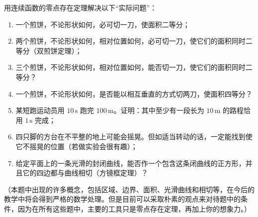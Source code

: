 \begin{xreferenceproblem}[1]
用连续函数的零点存在定理解决以下“实际问题”：
  \begin{enumerate}[label=(\arabic*)]
    \item 一个煎饼，不论形状如何，必可切一刀，使面积二等分；
    \item 两个煎饼，不论形状如何，相对位置如何，必可切一刀，使它们的面积同时二等分（双煎饼定理）；
    \item 三个煎饼，不论形状如何，相对位置如何，能否切一刀，使它们的面积同时二等分？
    \item 一个煎饼，不论形状如何，是否能以相互垂直的方式切两刀，使面积四等分？
    \item 某短跑运动员用 $10\,\mathrm{s}$ 跑完 $100\,\mathrm{m}$。证明：其中至少有一段长为 $10\,\mathrm{m}$ 的路程恰用 $1\,\mathrm{s}$ 完成；
    \item 四只脚的方台在不平整的地上可能会摇晃。但如适当转动的话，一定能找到使它不摇晃的位置（若做实验会很有趣）；
    \item 给定平面上的一条光滑的封闭曲线，能否作一个包含这条闭曲线的正方形，并且它的四边都与曲线相切（方镜框定理）？
  \end{enumerate}

  （本题中出现的许多概念，包括区域、边界、面积、光滑曲线和相切等，在今后的教学中将会得到严格的数学处理。但是目前可以采取朴素的观点来对待题中的条件，因为在所有这些题中，主要的工具只是零点存在定理，再加上你的想象力。）
\end{xreferenceproblem}
